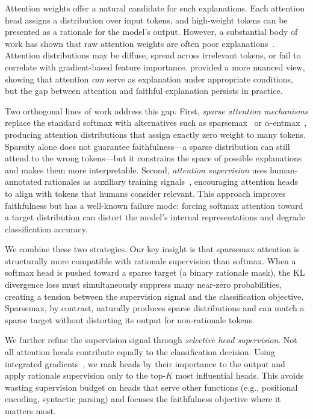 \documentclass{article}
\begin{document}
Attention weights offer a natural candidate for such explanations. Each
attention head assigns a distribution over input tokens, and high-weight
tokens can be presented as a rationale for the model's output. However,
a substantial body of work has shown that raw attention weights are often
poor explanations~\citep{jain2019attention}. Attention distributions may
be diffuse, spread across irrelevant tokens, or fail to correlate with
gradient-based feature importance. \citet{wiegreffe2019attention} provided
a more nuanced view, showing that attention \emph{can} serve as explanation
under appropriate conditions, but the gap between attention and faithful
explanation persists in practice.

Two orthogonal lines of work address this gap. First, \emph{sparse attention
mechanisms} replace the standard softmax with alternatives such as
sparsemax~\citep{martins2016sparsemax} or $\alpha$-entmax~\citep{correia2019adaptively},
producing attention distributions that assign exactly zero weight to many
tokens. Sparsity alone does not guarantee faithfulness---a sparse distribution
can still attend to the wrong tokens---but it constrains the space of possible
explanations and makes them more interpretable. Second, \emph{attention
supervision} uses human-annotated rationales as auxiliary training
signals~\citep{ghaeini2018interpreting, deyoung2020eraser}, encouraging
attention heads to align with tokens that humans consider relevant. This
approach improves faithfulness but has a well-known failure mode: forcing
softmax attention toward a target distribution can distort the model's
internal representations and degrade classification accuracy.

We combine these two strategies. Our key insight is that sparsemax attention
is structurally more compatible with rationale supervision than softmax.
When a softmax head is pushed toward a sparse target (a binary rationale
mask), the KL divergence loss must simultaneously suppress many near-zero
probabilities, creating a tension between the supervision signal and the
classification objective. Sparsemax, by contrast, naturally produces sparse
distributions and can match a sparse target without distorting its output
for non-rationale tokens.

We further refine the supervision signal through \emph{selective head
supervision}. Not all attention heads contribute equally to the classification
decision. Using integrated gradients~\citep{sundararajan2017axiomatic}, we
rank heads by their importance to the output and apply rationale supervision
only to the top-$K$ most influential heads. This avoids wasting supervision
budget on heads that serve other functions (e.g., positional encoding,
syntactic parsing) and focuses the faithfulness objective where it matters
most.
\end{document}
